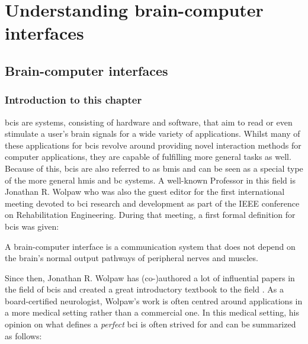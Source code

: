 
\part{Understanding brain-computer interfaces}
\label{part:understanding}


\glsresetall

\chapter{Brain-computer interfaces}
\label{ch:bci}

\section{Introduction to this chapter}
\label{sec:bci_introduction}

\Glspl{bci} are systems, consisting of hardware and software, that aim to read or even stimulate a user's brain signals for a wide variety of applications.
Whilst many of these applications for \glspl{bci} revolve around providing novel interaction methods for computer applications, they are capable of fulfilling more general tasks as well.
Because of this, \glspl{bci} are also referred to as \glspl{bmi} and can be seen as a special type of the more general \glspl{hmi} and \gls{bc} systems.
A well-known Professor in this field is Jonathan R. Wolpaw who was also the guest editor for the first international meeting devoted to \gls{bci} research and development as part of the IEEE conference on Rehabilitation Engineering.
During that meeting, a first formal definition for \glspl{bci} was given:

\setlength{\epigraphwidth}{0.9\textwidth}
\epigraph{A brain-computer interface is a communication system that does not depend on the brain’s normal output pathways of peripheral nerves and muscles.}{\textit{\citet{first_bci_meeting}}}

Since then, Jonathan R. Wolpaw has (co-)authored a lot of influential papers in the field of \glspl{bci} \citep{bci_rehabilitation, bci_in_medicine, first_bci_meeting} and created a great introductory textbook to the field \citep{bci_book}.
As a board-certified neurologist, Wolpaw's work is often centred around applications in a more medical setting rather than a commercial one. In this medical setting, his opinion on what defines a \textit{perfect} \gls{bci} is often strived for and can be summarized as follows:

